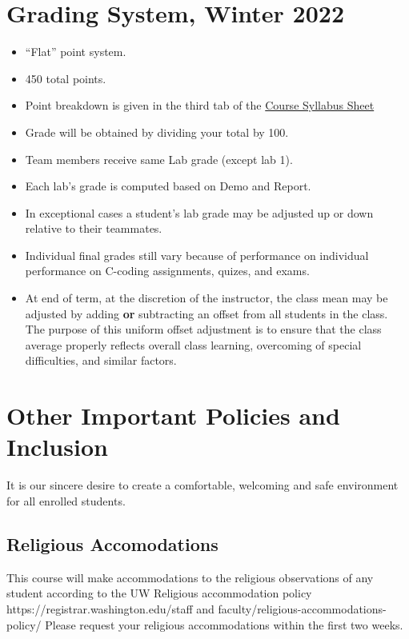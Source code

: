 \documentclass{article}	%
\begin{document}
\section{ Grading System, Winter 2022}
\begin{itemize}
        \item ``Flat'' point system.
        \item 450 total points.
        \item Point breakdown is given in the third tab of the 
        \href{https://docs.google.com/spreadsheets/d/1pLo5GvlvPP_WHET6sbK7IhZyR_x2ABR-7OutT0kR_mc/edit#gid=870260692}
        {Course Syllabus Sheet} 

        \item Grade will be obtained by dividing your total by 100.
        \item Team members receive same Lab grade (except lab 1).
        \item Each lab's grade is computed based on Demo and Report.
        \item In exceptional cases a student's lab grade may be adjusted
              up or down relative to their teammates.
        \item Individual final grades still vary because of performance on 
        individual performance on C-coding assignments, quizes, and exams.\vspace{0.5in}
        
        \item At end of term, at the discretion of the instructor, the class mean
        may be adjusted by adding {\bf or} subtracting an offset from all students in
              the class.  The purpose of this uniform offset adjustment is to ensure
              that the class average properly reflects overall class learning, overcoming
              of special difficulties, and similar factors.
\end{itemize}

  
    
\section{Other Important Policies and Inclusion}
It is our sincere desire to create a comfortable, welcoming and safe environment for all enrolled students. 

\subsection{Religious Accomodations}
This course will make accommodations to the religious observations of any student according to the UW Religious accommodation policy https://registrar.washington.edu/staff and faculty/religious-accommodations-policy/
Please request your religious accommodations within the first two weeks.
\end{document}
